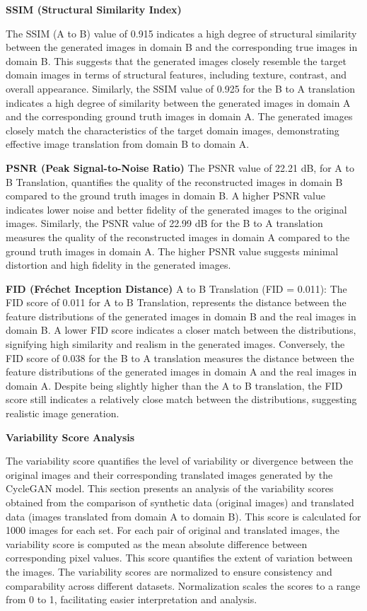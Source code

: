 \documentclass[UKenglish,12pt]{master-style}
\begin{document}
\textbf{SSIM (Structural Similarity Index)}

The SSIM (A to B) value of 0.915 indicates a high degree of structural similarity between the generated images in domain B and the corresponding true images in domain B. This suggests that the generated images closely resemble the target domain images in terms of structural features, including texture, contrast, and overall appearance. Similarly, the SSIM value of 0.925 for the B to A translation indicates a high degree of similarity between the generated images in domain A and the corresponding ground truth images in domain A. The generated images closely match the characteristics of the target domain images, demonstrating effective image translation from domain B to domain A.

\textbf{PSNR (Peak Signal-to-Noise Ratio)}
The PSNR value of 22.21 dB, for A to B Translation, quantifies the quality of the reconstructed images in domain B compared to the ground truth images in domain B. A higher PSNR value indicates lower noise and better fidelity of the generated images to the original images. Similarly, the PSNR value of 22.99 dB for the B to A translation measures the quality of the reconstructed images in domain A compared to the ground truth images in domain A. The higher PSNR value suggests minimal distortion and high fidelity in the generated images.

\textbf{FID (Fréchet Inception Distance)}
A to B Translation (FID = 0.011):
The FID score of 0.011 for A to B Translation, represents the distance between the feature distributions of the generated images in domain B and the real images in domain B. A lower FID score indicates a closer match between the distributions, signifying high similarity and realism in the generated images. Conversely, the FID score of 0.038 for the B to A translation measures the distance between the feature distributions of the generated images in domain A and the real images in domain A. Despite being slightly higher than the A to B translation, the FID score still indicates a relatively close match between the distributions, suggesting realistic image generation.

\textbf{Variability Score Analysis}

The variability score quantifies the level of variability or divergence between the original images and their corresponding translated images generated by the CycleGAN model. This section presents an analysis of the variability scores obtained from the comparison of synthetic data (original images) and translated data (images translated from domain A to domain B). This score is calculated for 1000 images for each set. For each pair of original and translated images, the variability score is computed as the mean absolute difference between corresponding pixel values. This score quantifies the extent of variation between the images. The variability scores are normalized to ensure consistency and comparability across different datasets. Normalization scales the scores to a range from 0 to 1, facilitating easier interpretation and analysis.
\end{document}
